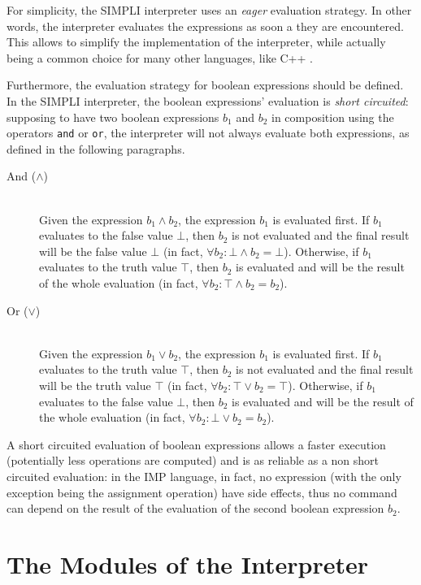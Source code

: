 \documentclass{esposito-documentation}
\begin{document}
For simplicity, the SIMPLI interpreter uses an \emph{eager} evaluation
strategy. In other words, the interpreter evaluates the expressions as soon a
they are encountered. This allows to simplify the implementation of the
interpreter, while actually being a common choice for many other languages,
like C++ \cite{Stroustrup2013}.

Furthermore, the evaluation strategy for boolean expressions should be defined.
In the SIMPLI interpreter, the boolean expressions' evaluation is \emph{short
circuited}: supposing to have two boolean expressions $b_1$ and $b_2$ in
composition using the operators \texttt{and} or \texttt{or}, the interpreter
will not always evaluate both expressions, as defined in the following
paragraphs.
\begin{description}
	\item[And ($\land$)] \hfill \\
		Given the expression $b_1 \land b_2$, the expression $b_1$ is evaluated
		first. If $b_1$ evaluates to the false value $\bot$, then $b_2$ is not
		evaluated and the final result will be the false value $\bot$ (in fact,
		$\forall b_2: \bot \land b_2 = \bot$).  Otherwise, if $b_1$ evaluates
		to the truth value $\top$, then $b_2$ is evaluated and will be the
		result of the whole evaluation (in fact, $\forall b_2: \top\land
		b_2=b_2$).
	\item[Or ($\vee$)] \hfill \\
		Given the expression $b_1 \vee b_2$, the expression $b_1$ is evaluated
		first. If $b_1$ evaluates to the truth value $\top$, then $b_2$ is not
		evaluated and the final result will be the truth value $\top$ (in fact,
		$\forall b_2: \top \vee b_2 = \top$).  Otherwise, if $b_1$ evaluates to
		the false value $\bot$, then $b_2$ is evaluated and will be the result
		of the whole evaluation (in fact, $\forall b_2: \bot\vee b_2=b_2$).
\end{description}

A short circuited evaluation of boolean expressions allows a faster execution
(potentially less operations are computed) and is as reliable as a non short
circuited evaluation: in the IMP language, in fact, no expression (with the
only exception being the assignment operation) have side effects, thus no
command can depend on the result of the evaluation of the second boolean
expression $b_2$.

\section{The Modules of the Interpreter}
\end{document}
